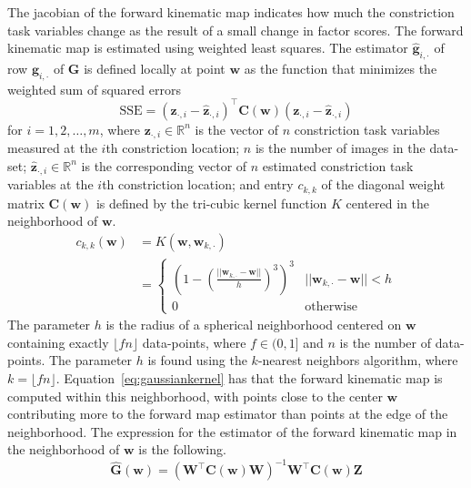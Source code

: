 \documentclass[preprint]{JASAnew}\usepackage[]{graphicx}\usepackage[]{color}
\begin{document}
%
The jacobian of the forward kinematic map indicates how much the constriction task variables change as the result of a small change in factor scores.
%
The forward kinematic map is estimated using weighted least squares. 
% 
The estimator $\mathbf{\hat{g}}_{i,\cdot}$ of row $\mathbf{g}_{i,\cdot}$ of $\mathbf{G}$ is defined locally at point $\mathbf{w}$ as the function that minimizes the weighted sum of squared errors
%
\begin{equation}
\mathrm{SSE} 
=
\left( \mathbf{z}_{\cdot,i} - \mathbf{\hat{z}}_{\cdot,i} \right)^\intercal
\mathbf{C}(\mathbf{w})
\left( \mathbf{z}_{\cdot,i} - \mathbf{\hat{z}}_{\cdot,i} \right)
\end{equation}
%
for $i=1,2,\ldots,m$,
% 
where $\mathbf{z}_{\cdot,i} \in \mathbb{R}^{n}$ is the vector of $n$ constriction task variables measured at the $i$th constriction location; 
%
$n$ is the number of images in the data-set; 
%
$\mathbf{\hat{z}}_{\cdot,i} \in \mathbb{R}^{n}$ is the corresponding vector of $n$ estimated constriction task variables at the $i$th constriction location; and 
%
entry $c_{k,k}$ of the diagonal weight matrix $\mathbf{C}(\mathbf{w})$ is defined by the tri-cubic kernel function $K$ centered in the neighborhood of $\mathbf{w}$.
%
\begin{align}\label{eq:gaussiankernel}
c_{k,k} (\mathbf{w})
&=
K(\mathbf{w},\mathbf{w}_{k,\cdot}) \\
&= 
\begin{cases}
\left( 1 - \left( \frac{\lvert\lvert \mathbf{w}_{k,\cdot} - \mathbf{w} \rvert\rvert}{h} \right)^3 \right)^3 & \lvert\lvert \mathbf{w}_{k,\cdot} - \mathbf{w} \rvert\rvert < h \\
0 & \text{otherwise}
\end{cases} 
\end{align}
%
The parameter $h$ is the radius of a spherical neighborhood centered on $\mathbf{w}$ containing exactly $\lfloor fn \rfloor$ data-points, where $f\in (0,1]$ and $n$ is the number of data-points. The parameter $h$ is found using the $k$-nearest neighbors algorithm, where $k = \lfloor fn \rfloor$. Equation~\ref{eq:gaussiankernel} has that the forward kinematic map is computed within this neighborhood, 
with points close to the center $\mathbf{w}$ contributing more to the forward map estimator than points at the edge of the neighborhood.
%
The expression for the estimator of the forward kinematic map in the neighborhood of $\mathbf{w}$ is the following. 
\begin{equation}
\label{eq:lsqestimator}
\mathbf{\hat{G}} (\mathbf{w})
=
\left( \mathbf{W}^\intercal \mathbf{C}(\mathbf{w}) \mathbf{W} \right)^{-1} \mathbf{W}^\intercal \mathbf{C}(\mathbf{w}) \mathbf{Z}
\end{equation}
\end{document}
